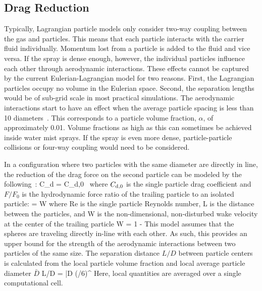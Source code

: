 \subsection{Drag Reduction}
\label{sec:threeway}

Typically, Lagrangian particle models only consider two-way coupling between the gas and particles. This means that each particle interacts with the carrier fluid individually. Momentum lost from a particle is added to the fluid and vice versa. If the spray is dense enough, however, the individual particles influence each other through aerodynamic interactions. These effects cannot be captured by the current Eulerian-Lagrangian model for two reasons. First, the Lagrangian particles occupy no volume in the Eulerian space. Second, the separation lengths would be of sub-grid scale in most practical simulations. The aerodynamic interactions start to have an effect when the average particle spacing is less than 10 diameters~\cite{Prahl:1,Prahl:2}. This corresponds to a particle volume fraction, $\alpha$, of approximately 0.01. Volume fractions as high as this can sometimes be achieved inside water mist sprays. If the spray is even more dense, particle-particle collisions or four-way coupling would need to be considered.

In a configuration where two particles with the same diameter are directly in line, the reduction of the drag force on the second particle can be modeled by the following~\cite{Ramirez:1}:
\be
  C_{\rm d} = C_{\rm d,0} \,  \label{eq:dragred}
\ee
where $C_{\rm d,0}$ is the single particle drag coefficient and $F / F_0$ is the hydrodynamic force ratio of the trailing particle to an isolated particle:
\be
   = W  \label{eq:dragredfact}
\ee
where Re is the single particle Reynolds number, L is the distance between the particles, and W is the non-dimensional, non-disturbed wake velocity at the center of the trailing particle
\be
  W = 1 -   \label{eq:Wake-Vel}
\ee
This model assumes that the spheres are traveling directly in-line with each other. As such, this provides an upper bound for the strength of the aerodynamic interactions between two particles of the same size. The separation distance $L/D$ between particle centers is calculated from the local particle volume fraction and local average particle diameter $\bar{D}$
\be
  L/D = \bar{D} \left(\pi/6\alpha \right)^{}
\ee
Here, local quantities are averaged over a single computational cell.

